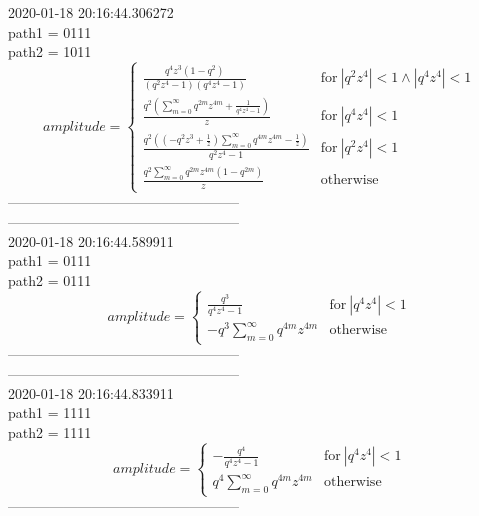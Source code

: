 2020-01-18 20:16:44.306272\\
path1 = 0111\\
path2 = 1011\\
$$amplitude = \begin{cases} \frac{q^{4} z^{3} \left(1 - q^{2}\right)}{\left(q^{2} z^{4} - 1\right) \left(q^{4} z^{4} - 1\right)} & \text{for}\: \left|{q^{2} z^{4}}\right| < 1 \wedge \left|{q^{4} z^{4}}\right| < 1 \\\frac{q^{2} \left(\sum_{m=0}^{\infty} q^{2 m} z^{4 m} + \frac{1}{q^{4} z^{4} - 1}\right)}{z} & \text{for}\: \left|{q^{4} z^{4}}\right| < 1 \\\frac{q^{2} \left(\left(- q^{2} z^{3} + \frac{1}{z}\right) \sum_{m=0}^{\infty} q^{4 m} z^{4 m} - \frac{1}{z}\right)}{q^{2} z^{4} - 1} & \text{for}\: \left|{q^{2} z^{4}}\right| < 1 \\\frac{q^{2} \sum_{m=0}^{\infty} q^{2 m} z^{4 m} \left(1 - q^{2 m}\right)}{z} & \text{otherwise} \end{cases}$$
--------------------------------------------------\\
--------------------------------------------------\\
2020-01-18 20:16:44.589911\\
path1 = 0111\\
path2 = 0111\\
$$amplitude = \begin{cases} \frac{q^{3}}{q^{4} z^{4} - 1} & \text{for}\: \left|{q^{4} z^{4}}\right| < 1 \\- q^{3} \sum_{m=0}^{\infty} q^{4 m} z^{4 m} & \text{otherwise} \end{cases}$$
--------------------------------------------------\\
--------------------------------------------------\\
2020-01-18 20:16:44.833911\\
path1 = 1111\\
path2 = 1111\\
$$amplitude = \begin{cases} - \frac{q^{4}}{q^{4} z^{4} - 1} & \text{for}\: \left|{q^{4} z^{4}}\right| < 1 \\q^{4} \sum_{m=0}^{\infty} q^{4 m} z^{4 m} & \text{otherwise} \end{cases}$$
--------------------------------------------------\\
